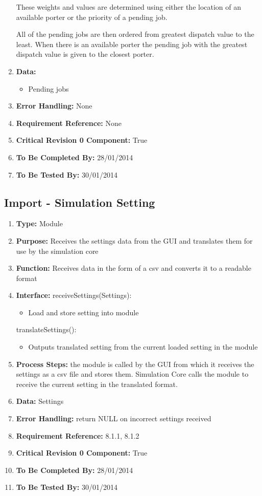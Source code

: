 \documentclass[paper=letter, fontsize=10pt]{scrartcl}
\numberwithin{equation}{section}		%
\numberwithin{figure}{section}			%
\numberwithin{table}{section}				%
\begin{document}
\begin{enumerate}[]
	These weights and values are determined using either the location of an available porter or the priority of a pending job.
	
	All of the pending jobs are then ordered from greatest dispatch value to the least.  When there is an available porter the pending job with the greatest dispatch value is given to the closest porter.
	\item \textbf{Data:}
		\begin{itemize}
			\item Pending jobs
		\end{itemize}
	\item \textbf{Error Handling:} None
	\item \textbf{Requirement Reference:} None
	\item \textbf{Critical Revision 0 Component:} True
	\item \textbf{To Be Completed By:} 28/01/2014
	\item \textbf{To Be Tested By:} 30/01/2014
\end{enumerate}
\subsection{Import - Simulation Setting}
\begin{enumerate}[]
	\item \textbf{Type:} Module
	\item \textbf{Purpose:} Receives the settings data from the GUI and translates them for use by the simulation core
	\item \textbf{Function:} Receives data in the form of a csv and converts it to a readable format
	\item \textbf{Interface:} \newline
	receiveSettings(Settings):
	 	\begin{itemize}
	 		\item Load and store setting into module
	 	\end{itemize}
	 translateSettings():
	 	\begin{itemize}
	 		\item Outputs translated setting from the current loaded setting in the module
	 	\end{itemize}
	\item \textbf{Process Steps:} the module is called by the GUI from which it receives the settings as a csv file and stores them. Simulation Core calls the module to receive the current setting in the translated format. 
	\item \textbf{Data:} Settings
	\item \textbf{Error Handling:} return NULL on incorrect settings received
	\item \textbf{Requirement Reference:} 8.1.1, 8.1.2
	\item \textbf{Critical Revision 0 Component:} True
	\item \textbf{To Be Completed By:} 28/01/2014
	\item \textbf{To Be Tested By:} 30/01/2014
\end{enumerate}
\end{document}
